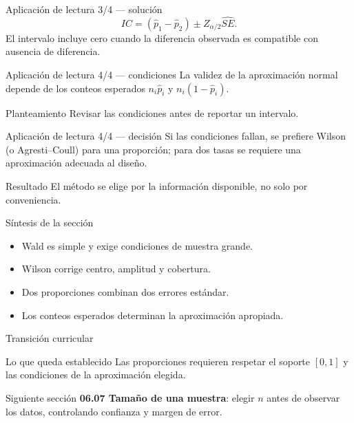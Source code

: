 \documentclass[10pt,aspectratio=169]{beamer}
\begin{document}
\begin{frame}{Aplicación de lectura 3/4 --- solución}
  \footnotesize
  \[
    IC=(\hat p_1-\hat p_2)\pm Z_{\alpha/2}\widehat{SE}.
  \]
  El intervalo incluye cero cuando la diferencia observada es compatible con
  ausencia de diferencia.
\end{frame}

\begin{frame}{Aplicación de lectura 4/4 --- condiciones}
  \footnotesize
  La validez de la aproximación normal depende de los conteos esperados
  $n_i\hat p_i$ y $n_i(1-\hat p_i)$.
  \begin{block}{Planteamiento}
    Revisar las condiciones antes de reportar un intervalo.
  \end{block}
\end{frame}

\begin{frame}{Aplicación de lectura 4/4 --- decisión}
  \footnotesize
  Si las condiciones fallan, se prefiere Wilson (o Agresti--Coull) para una
  proporción; para dos tasas se requiere una aproximación adecuada al diseño.
  \begin{exampleblock}{Resultado}
    El método se elige por la información disponible, no solo por conveniencia.
  \end{exampleblock}
\end{frame}

\begin{frame}{Síntesis de la sección}
  \footnotesize
  \begin{itemize}\itemsep=0.12cm
    \item Wald es simple y exige condiciones de muestra grande.
    \item Wilson corrige centro, amplitud y cobertura.
    \item Dos proporciones combinan dos errores estándar.
    \item Los conteos esperados determinan la aproximación apropiada.
  \end{itemize}
\end{frame}

\begin{frame}{Transición curricular}
  \footnotesize
  \begin{block}{Lo que queda establecido}
    Las proporciones requieren respetar el soporte $[0,1]$ y las condiciones de
    la aproximación elegida.
  \end{block}
  \begin{alertblock}{Siguiente sección}
    \textbf{06.07 Tamaño de una muestra}: elegir $n$ antes de observar los
    datos, controlando confianza y margen de error.
  \end{alertblock}
\end{frame}
\end{document}
